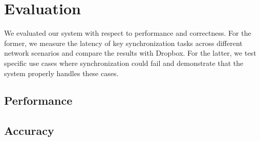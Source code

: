 \section{Evaluation}
\label{evaluation}
We evaluated our system with respect to performance and correctness.
For the former, we measure the latency of key synchronization tasks
across different network scenarios and compare the results
with Dropbox. For the latter, we test specific use cases
where synchronization could fail and demonstrate that the system
properly handles these cases.

\subsection{Performance}
\label{evaluation.performance}


\subsection{Accuracy}
\label{evaluation.accuracy}

